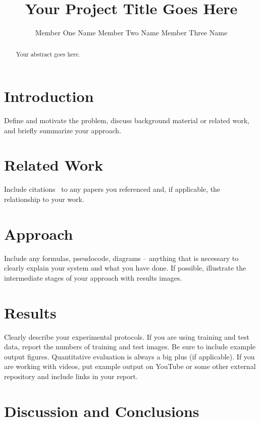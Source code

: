 \documentclass[10pt,twocolumn,letterpaper]{article}
\begin{document}
\title{Your Project Title Goes Here}

\author{
Member One Name \hspace{1in} Member Two Name \hspace{1in} Member Three Name 
}
\maketitle

\begin{abstract}
  Your abstract goes here.
\end{abstract}

\section{Introduction}

Define and motivate the problem, discuss background material or related work, and briefly summarize your approach.

\section{Related Work}

Include citations~\cite{Alpher02,Alpher03} to any papers you referenced and, if applicable, the relationship to your work.

\section{Approach}

Include any formulas, pseudocode, diagrams -- anything that is necessary to clearly explain your system and what you have done. If possible, illustrate the intermediate stages of your approach with results images.

\section{Results}

Clearly describe your experimental protocols. If you are using training and test data, report the numbers of training and test images. Be sure to include example output figures. Quantitative evaluation is always a big plus (if applicable). If you are working with videos, put example output on YouTube or some other external repository and include links in your report.

\section{Discussion and Conclusions}
\end{document}
